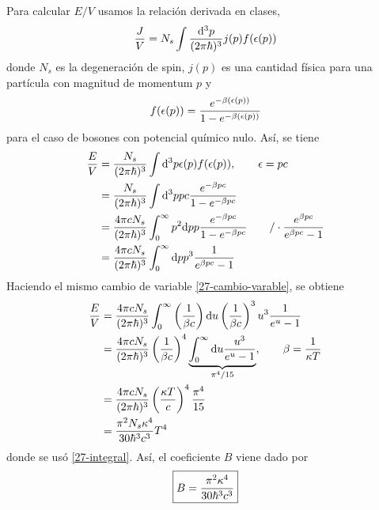 \begin{sol}
Para calcular $E/V$ usamos la relación derivada en clases,
\begin{equation}\label{J/E}
  \frac{J}{V}=N_s\int\frac{\dd^3p}{(2\pi\hbar)^3}j(p)f(\epsilon(p))
\end{equation}
donde $N_s$ es la degeneración de spin, $j(p)$ es una cantidad física para una partícula con magnitud de momentum $p$ y 
\begin{equation}
  f(\epsilon(p))=\frac{e^{-\beta(\epsilon(p))}}{1-e^{-\beta(\epsilon(p))}}
\end{equation}
para el caso de bosones con potencial químico nulo. Así, se tiene
\begin{align}
  \frac{E}{V}&=\frac{N_s}{(2\pi\hbar)^3}\int\dd^3p\epsilon(p)f(\epsilon(p)),\qquad \epsilon=pc\\
  &=\frac{N_s}{(2\pi\hbar)^3}\int\dd^3p pc \frac{e^{-\beta pc}}{1-e^{-\beta pc}}\\
  &=\frac{4\pi cN_s}{(2\pi\hbar)^3}\int_0^\infty p^2\dd p p \frac{e^{-\beta pc}}{1-e^{-\beta pc}}\qquad /\cdot \frac{e^{\beta pc}}{e^{\beta pc}-1}\\
  &=\frac{4\pi cN_s}{(2\pi\hbar)^3}\int_0^\infty\dd pp^3\frac{1}{e^{\beta pc}-1}
\end{align}
Haciendo el mismo cambio de variable \eqref{27-cambio-varable}, se obtiene
\begin{align}
  \frac{E}{V}&=\frac{4\pi cN_s}{(2\pi\hbar)^3}\int_0^\infty \left(\frac{1}{\beta c}\right)\dd u\left(\frac{1}{\beta c}\right)^3u^3\frac{1}{e^{u}-1}\\
  &=\frac{4\pi cN_s}{(2\pi\hbar)^3}\left(\frac{1}{\beta c}\right)^4\underbrace{\int_0^\infty \dd u\frac{u^3}{e^{u}-1}}_{\pi^4/15},\qquad \beta=\frac{1}{\kappa T}\\
  &=\frac{4\pi cN_s}{(2\pi\hbar)^3}\left(\frac{\kappa T}{c}\right)^4\frac{\pi^4}{15}\\
  &=\frac{\pi^2N_s\kappa^4}{30\hbar^3c^3}T^4
\end{align}
donde se usó \eqref{27-integral}. Así, el coeficiente $B$ viene dado por
\begin{equation}
\boxed{  B=\frac{\pi^2\kappa^4}{30\hbar^3c^3}}
\end{equation}



















\end{sol}